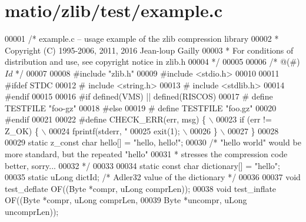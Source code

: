 \hypertarget{matio_2zlib_2test_2example_8c_source}{}\section{matio/zlib/test/example.c}
\label{matio_2zlib_2test_2example_8c_source}

\begin{DoxyCode}
00001 \textcolor{comment}{/* example.c -- usage example of the zlib compression library}
00002 \textcolor{comment}{ * Copyright (C) 1995-2006, 2011, 2016 Jean-loup Gailly}
00003 \textcolor{comment}{ * For conditions of distribution and use, see copyright notice in zlib.h}
00004 \textcolor{comment}{ */}
00005 
00006 \textcolor{comment}{/* @(#) $Id$ */}
00007 
00008 \textcolor{preprocessor}{#include "zlib.h"}
00009 \textcolor{preprocessor}{#include <stdio.h>}
00010 
00011 \textcolor{preprocessor}{#ifdef STDC}
00012 \textcolor{preprocessor}{#  include <string.h>}
00013 \textcolor{preprocessor}{#  include <stdlib.h>}
00014 \textcolor{preprocessor}{#endif}
00015 
00016 \textcolor{preprocessor}{#if defined(VMS) || defined(RISCOS)}
00017 \textcolor{preprocessor}{#  define TESTFILE "foo-gz"}
00018 \textcolor{preprocessor}{#else}
00019 \textcolor{preprocessor}{#  define TESTFILE "foo.gz"}
00020 \textcolor{preprocessor}{#endif}
00021 
00022 \textcolor{preprocessor}{#define CHECK\_ERR(err, msg) \{ \(\backslash\)}
00023 \textcolor{preprocessor}{    if (err != Z\_OK) \{ \(\backslash\)}
00024 \textcolor{preprocessor}{        fprintf(stderr, "%
00025 \textcolor{preprocessor}{        exit(1); \(\backslash\)}
00026 \textcolor{preprocessor}{    \} \(\backslash\)}
00027 \textcolor{preprocessor}{\}}
00028 
00029 \textcolor{keyword}{static} z\_const \textcolor{keywordtype}{char} hello[] = \textcolor{stringliteral}{"hello, hello!"};
00030 \textcolor{comment}{/* "hello world" would be more standard, but the repeated "hello"}
00031 \textcolor{comment}{ * stresses the compression code better, sorry...}
00032 \textcolor{comment}{ */}
00033 
00034 \textcolor{keyword}{static} \textcolor{keyword}{const} \textcolor{keywordtype}{char} dictionary[] = \textcolor{stringliteral}{"hello"};
00035 \textcolor{keyword}{static} uLong dictId;    \textcolor{comment}{/* Adler32 value of the dictionary */}
00036 
00037 \textcolor{keywordtype}{void} test\_deflate       OF((Byte *compr, uLong comprLen));
00038 \textcolor{keywordtype}{void} test\_inflate       OF((Byte *compr, uLong comprLen,
00039                             Byte *uncompr, uLong uncomprLen));
}
\end{DoxyCode}

